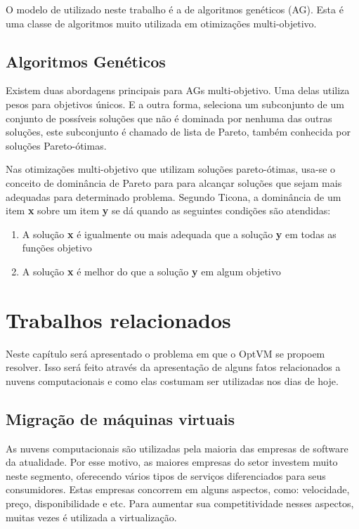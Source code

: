 O modelo de utilizado neste trabalho é a de algoritmos genéticos (AG). Esta é uma classe de 
algoritmos muito utilizada em otimizações multi-objetivo.

\subsection{Algoritmos Genéticos}
Existem duas abordagens principais para AGs multi-objetivo. Uma delas utiliza pesos para objetivos 
únicos. E a outra forma, seleciona um subconjunto de um conjunto de possíveis soluções que não é 
dominada por nenhuma das outras soluções, este subconjunto é chamado de lista de Pareto, 
também conhecida por soluções Pareto-ótimas.

Nas otimizações multi-objetivo que utilizam soluções pareto-ótimas, usa-se o conceito de 
dominância de Pareto para  para alcançar soluções que sejam mais  adequadas para determinado problema. 
Segundo Ticona\cite{ticona}, a dominância de um item \textbf{x} sobre um item \textbf{y} se dá quando 
as seguintes condições são atendidas:

\begin{enumerate}
\item A solução \textbf{x} é igualmente ou mais adequada que a solução \textbf{y} em todas as funções objetivo
\item A solução \textbf{x} é melhor do que a solução \textbf{y} em algum objetivo
\end{enumerate}

\section{Trabalhos relacionados}
Neste capítulo será apresentado o problema em que o OptVM se propoem resolver. 
Isso será feito através da apresentação de alguns fatos relacionados a nuvens computacionais 
e como elas costumam ser utilizadas nos dias de hoje.

\subsection{Migração de máquinas virtuais}
As nuvens computacionais são utilizadas pela maioria das empresas de software da atualidade. 
Por esse motivo, as maiores empresas do setor investem muito neste segmento, 
oferecendo vários tipos de serviços diferenciados para seus consumidores. 
Estas empresas concorrem em alguns aspectos, como: velocidade, preço, disponibilidade e etc. 
Para aumentar sua competitividade nesses aspectos, muitas vezes é utilizada a virtualização.

